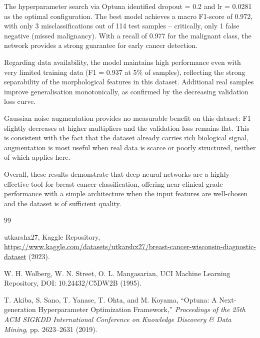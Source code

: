 \documentclass[prl,twocolumn]{revtex4-2}
\begin{document}
The hyperparameter search via Optuna identified dropout = 0.2 and lr = 0.0281
as the optimal configuration. The best model achieves a macro F1-score of
0.972, with only 3 misclassifications out of 114 test samples --
critically, only 1 false negative (missed malignancy). With a recall of 0.977
for the malignant class, the network provides a strong guarantee for early
cancer detection.

Regarding data availability, the model maintains high performance even with
very limited training data (F1 = 0.937 at 5\% of samples), reflecting the
strong separability of the morphological features in this dataset.
Additional real samples improve generalisation monotonically, as confirmed
by the decreasing validation loss curve.

Gaussian noise augmentation provides no measurable benefit on this dataset:
F1 slightly decreases at higher multipliers and the validation loss remains flat.
This is consistent with the fact that the dataset already carries rich biological
signal, augmentation is most useful when real data is scarce or poorly structured,
neither of which applies here.


Overall, these results demonstrate that deep neural networks are a highly effective
tool for breast cancer classification, offering near-clinical-grade performance
with a simple architecture when the input features are well-chosen and the
dataset is of sufficient quality.

\begin{thebibliography}{99}

  utkarshx27, Kaggle Repository, \url{https://www.kaggle.com/datasets/utkarshx27/breast-cancer-wisconsin-diagnostic-dataset} (2023).

  W. H. Wolberg, W. N. Street, O. L. Mangasarian,
  UCI Machine Learning Repository, DOI: 10.24432/C5DW2B (1995).

T. Akiba, S. Sano, T. Yanase, T. Ohta, and M. Koyama, 
``Optuna: A Next-generation Hyperparameter Optimization Framework,'' 
\textit{Proceedings of the 25th ACM SIGKDD International Conference on Knowledge Discovery \& Data Mining}, pp. 2623--2631 (2019).  

\end{thebibliography}
\end{document}
